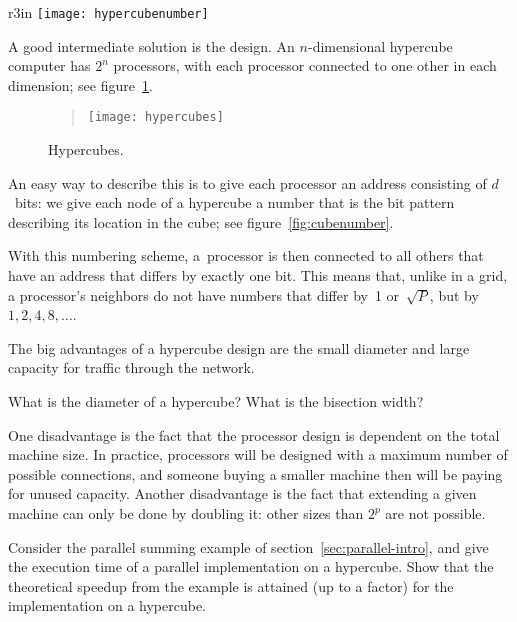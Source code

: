 \begin{wrapfigure}{r}{3in}
  \texttt{[image: hypercubenumber]}
  \caption{Numbering of the nodes of a hypercube.}
  \label{fig:cubenumber}
\end{wrapfigure}
%
A good intermediate solution is the  design. An
$n$-dimensional hypercube computer has $2^n$ processors, with each
processor connected to one other in each dimension; see
figure~\ref{fig:hypercube}. 

\begin{figure}[t]
  \begin{quote}
  \texttt{[image: hypercubes]}
  \end{quote}
  \caption{Hypercubes.}
  \label{fig:hypercube}
\end{figure}


An easy way to describe this is to give each processor an address
consisting of $d$~bits: we give each node of a hypercube a number that
is the bit pattern describing its location in the cube; see
figure~\ref{fig:cubenumber}.

With this numbering scheme, a~processor is then connected to all others
that have an address that differs by exactly one bit. This means that,
unlike in a grid, a processor's neighbors do not have numbers
that differ by~1 or~$\sqrt P$, but by~$1,2,4,8,\ldots$.

The big advantages of a hypercube design are the small diameter and
large capacity for traffic through the network.
\begin{exercise}
  \label{ex:bisection-hypercube}
  What is the diameter of a hypercube? What is the bisection width?
\end{exercise}

One disadvantage is the fact that the processor design is dependent on
the total machine size. In practice, processors will be designed with
a maximum number of possible connections, and someone buying a smaller
machine then will be paying for unused capacity.  Another
disadvantage is the fact that extending a given machine can only be
done by doubling it: other sizes than $2^p$ are not possible.

\begin{exercise}
  \label{ex:sum-hypercube}
  Consider the parallel summing example of
  section~\ref{sec:parallel-intro}, and give the execution time of a
  parallel implementation on a
  hypercube. Show that 
  the theoretical speedup from the example is attained (up to a
  factor) for the implementation on a hypercube.
\end{exercise}

